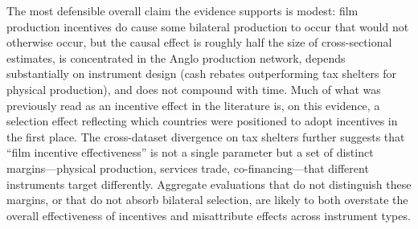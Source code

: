 The most defensible overall claim the evidence supports is modest: film production incentives do cause some bilateral production to occur that would not otherwise occur, but the causal effect is roughly half the size of cross-sectional estimates, is concentrated in the Anglo production network, depends substantially on instrument design (cash rebates outperforming tax shelters for physical production), and does not compound with time. Much of what was previously read as an incentive effect in the literature is, on this evidence, a selection effect reflecting which countries were positioned to adopt incentives in the first place. The cross-dataset divergence on tax shelters further suggests that ``film incentive effectiveness'' is not a single parameter but a set of distinct margins---physical production, services trade, co-financing---that different instruments target differently. Aggregate evaluations that do not distinguish these margins, or that do not absorb bilateral selection, are likely to both overstate the overall effectiveness of incentives and misattribute effects across instrument types.


